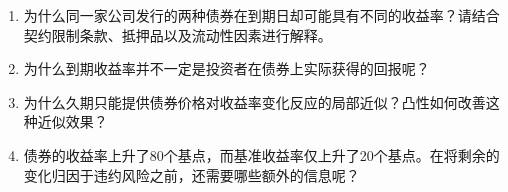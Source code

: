 \begin{enumerate}

\item 为什么同一家公司发行的两种债券在到期日却可能具有不同的收益率？请结合契约限制条款、抵押品以及流动性因素进行解释。

\item 为什么到期收益率并不一定是投资者在债券上实际获得的回报呢？

\item 为什么久期只能提供债券价格对收益率变化反应的局部近似？凸性如何改善这种近似效果？

\item 债券的收益率上升了80个基点，而基准收益率仅上升了20个基点。在将剩余的变化归因于违约风险之前，还需要哪些额外的信息呢？

\end{enumerate}



